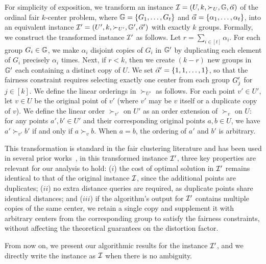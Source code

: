 For simplicity of exposition, we transform an instance $\mathcal{I} = (U, k, \succ_U, \mathbb{G}, \vec{\alpha})$ of the ordinal fair $k$-center problem, where $\mathbb{G} = \{G_1, \dots, G_t\}$ and $\vec{\alpha} = \{\alpha_1, \dots, \alpha_t\}$, into an equivalent instance $\mathcal{I}' = (U', k, \succ_{U'}, \mathbb{G}', \vec{\alpha}')$ with exactly $k$ groups.
Formally, we construct the transformed instance $\mathcal{I}'$ as follows. 
Let $r = \sum_{i \in [t]} \alpha_i$. 
For each group $G_i \in \mathbb{G}$, we make $\alpha_i$ disjoint copies of $G_i$ in $\mathbb{G}'$ by duplicating each element of $G_i$ precisely $\alpha_i$ times. Next, if $r < k$, then we create $(k-r)$ new groups in $\mathbb{G}'$ each containing a distinct copy of $U$. We set $\vec{\alpha}' = \{1, 1, \dots, 1\}$, so that the fairness constraint requires selecting exactly one center from each group $G'_j$ for $j \in [k]$. 
We define the linear orderings in $\succ_{U'}$ as follows. 
For each point $v' \in U'$, let $v \in U$ be the original point of $v'$ (where $v'$ may be $v$ itself or a duplicate copy of $v$). 
We define the linear order $\succ_{v'}$ on $U'$ as an order extension of $\succ_{v}$ on $U$: for any points $a', b' \in U'$ and their corresponding original points $a, b \in U$, we have $a' \succ_{v'} b'$ if and only if $a \succ_{v} b$.
When $a = b$, the ordering of $a'$ and $b'$ is arbitrary.







This transformation is standard in the fair clustering literature and has been used in several prior works~\cite{thejaswi2022clustering, thejaswi2024diversity, gadekar2025fair}, in this transformed instance $\mathcal{I}'$, three key properties are relevant for our analysis to hold: ($i$) the cost of optimal solution in $\mathcal{I}'$ remains identical to that of the original instance $\mathcal{I}$, since the additional points are duplicates; {($ii$) no extra distance queries are required, as duplicate points share identical distances;} and ($iii$) if the algorithm's output for $\mathcal{I}'$ contains multiple copies of the same center, we retain a single copy and supplement it with arbitrary 
centers
from the corresponding group to satisfy the fairness constraints, without affecting the theoretical guarantees on the distortion factor.

From now on, we present our algorithmic results for the instance $\mathcal{I}'$, and we directly write the instance as $\mathcal{I}$ when there is no ambiguity.




